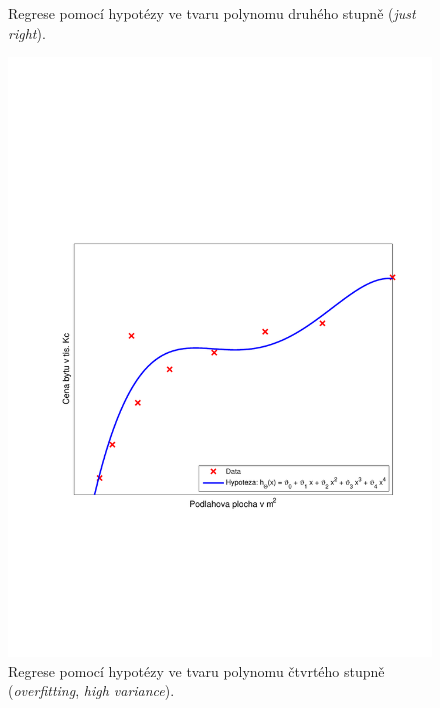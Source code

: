 \begin{figure}[!ht]
\begin{minipage}[t]{0.48\textwidth}
  		\caption{Regrese pomocí hypotézy ve tvaru polynomu druhého stupně (\textit{just right}).}
	\end{minipage}%
	\hfill
	\begin{minipage}[t]{0.48\textwidth}
		\includegraphics[width = \textwidth, trim = 2.5cm 7cm 2cm 9cm]{./Img/Regularizace/Pretrenovani1D/regrese_4.pdf}
  		\caption{Regrese pomocí hypotézy ve tvaru polynomu čtvrtého stupně (\textit{overfitting}, \textit{high variance}).}
	\end{minipage}%
\end{figure}

